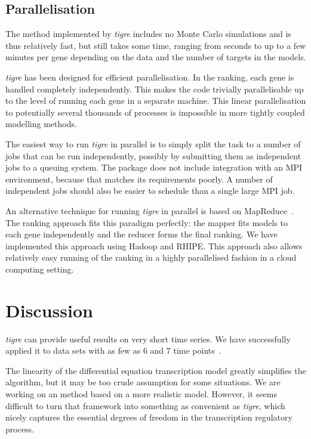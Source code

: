 \documentclass{bioinfo}
\newcommand{\tigre}{\emph{tigre}}
\begin{document}
\subsection{Parallelisation}

The method implemented by \tigre{} includes no Monte Carlo simulations
and is thus relatively fast, but still takes some time, ranging from
seconds to up to a few minutes per gene depending on the data and the
number of targets in the models.

\tigre{} has been designed for efficient parallelisation.  In the
ranking, each gene is handled completely independently.  This makes
the code trivially parallelisable up to the level of running each gene
in a separate machine.  This linear parallelisation to potentially
several thousands of processes is impossible in more tightly coupled
modelling methods.

The easiest way to run \tigre{} in parallel is to simply split the
task to a number of jobs that can be run independently, possibly by
submitting them as independent jobs to a queuing system.  The package
does not include integration with an MPI environment, because that
matches its requirements poorly.  A number of independent jobs should
also be easier to schedule than a single large MPI job.

An alternative technique for running \tigre{} in parallel is based on
MapReduce~\citep{Dean2008}.  The ranking approach fits this paradigm
perfectly: the mapper fits models to each gene independently and the
reducer forms the final ranking.  We have implemented this approach
using Hadoop and RHIPE.  This approach also allows relatively easy
running of the ranking in a highly parallelised fashion in a cloud
computing setting.

\section{Discussion}

\tigre{} can provide useful results on very short time series.  We
have successfully applied it to data sets with as few as 6 and 7 time
points~\citep{Honkela2010PNAS,Honkela2010MLSP}.

The linearity of the differential equation transcription model greatly
simplifies the algorithm, but it may be too crude assumption for some
situations.  We are working on an method based on a more realistic
model.  However, it seems difficult to turn that framework into
something as convenient as \tigre{}, which nicely captures the
essential degrees of freedom in the transcription regulatory process.
\end{document}
